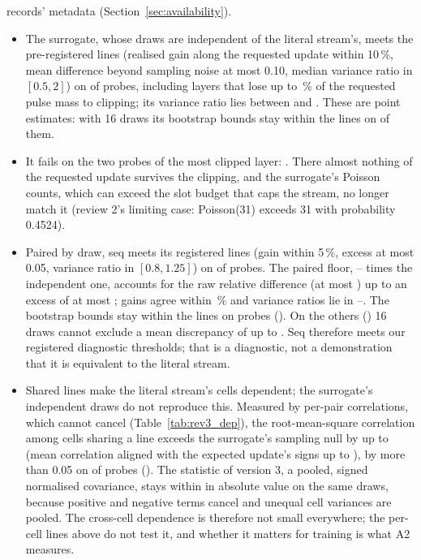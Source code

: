 records' metadata (Section~\ref{sec:availability}).
\begin{itemize}
\item The surrogate, whose draws are independent of the literal stream's, meets the pre-registered lines (realised gain along
      the requested update within 10\,\%, mean difference beyond sampling noise at most 0.10, median variance ratio in
      $[0.5, 2]$) on \RYProbeSurMeetsN{} of \RYProbeN{} probes, including layers that lose up to \RYProbeOkLostMax\,\% of the
      requested pulse mass to clipping; its variance ratio lies between \RYProbeSurVarMin{} and \RYProbeSurVarMax. These are
      point estimates: with 16 draws its bootstrap bounds stay within the lines on \RYProbeSurAtNinetyFiveN{} of them.
\item It fails on the two probes of the most clipped layer: \RYProbeSurFailList. There almost nothing of the requested update
      survives the clipping, and the surrogate's Poisson counts, which can exceed the slot budget that caps the stream, no longer
      match it (review 2's limiting case: Poisson(31) exceeds 31 with probability 0.4524).
\item Paired by draw, seq meets its registered lines (gain within 5\,\%, excess at most 0.05, variance ratio in
      $[0.8, 1.25]$) on \RYProbeSeqMeetsN{} of \RYProbeN{} probes. The paired floor, \RYProbeFloorRatioMin--\RYProbeFloorRatioMax{}
      times the independent one, accounts for the raw relative difference (at most \RYProbeSeqRawMax) up to an excess of at
      most \RYProbeSeqExcessMax; gains agree within \RYProbeSeqGainDevMax\,\% and variance ratios lie in
      \RYProbeSeqVarMin--\RYProbeSeqVarMax. The bootstrap bounds stay within the lines on \RYProbeSeqAtNinetyFiveN{} probes
      (\RYProbeSeqAtNinetyFiveList). On the others (\RYProbeSeqNotNinetyFiveList) 16 draws cannot exclude a mean discrepancy of
      up to \RYProbeSeqExcessPNinetyFiveMax. Seq therefore meets our registered diagnostic thresholds; that is a diagnostic,
      not a demonstration that it is equivalent to the literal stream.
\item Shared lines make the literal stream's cells dependent; the surrogate's independent draws do not reproduce this.
      Measured by per-pair correlations, which cannot cancel (Table~\ref{tab:rev3_dep}), the root-mean-square correlation among
      cells sharing a line exceeds the surrogate's sampling null by up to \RYDepExcessMax{} (mean correlation aligned with the
      expected update's signs up to \RYDepAlignedMax), by more than 0.05 on \RYDepLargeN{} of \RYProbeN{} probes
      (\RYDepLargeList). The statistic of version 3, a pooled, signed normalised covariance, stays within \RYDepVthreePooledMax{}
      in absolute value on the same draws, because positive and negative terms cancel and unequal cell variances are pooled.
      The cross-cell dependence is therefore not small everywhere; the per-cell lines above do not test it, and whether it
      matters for training is what A2 measures.
\end{itemize}
